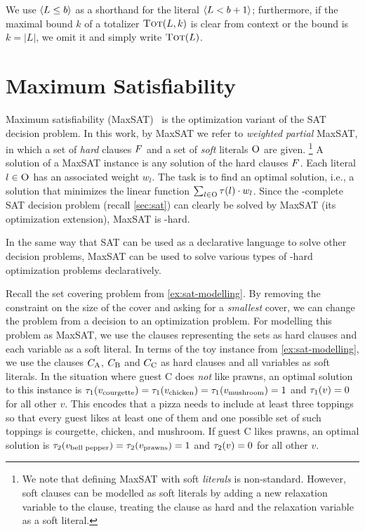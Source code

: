 We use $\langle L \leq b \rangle$ as a shorthand for the literal $\langle L < b+1 \rangle$;
furthermore, if the maximal bound $k$ of a totalizer $\textsc{Tot}(L,k)$ is clear from context or the bound is $k=|L|$, we omit it and simply write $\textsc{Tot}(L)$.

\section{Maximum Satisfiability\label{sec:max-sat}}

Maximum satisfiability (MaxSAT)~\autocite{handbook2-maxsat} is the optimization variant of the SAT decision problem.
In this work, by MaxSAT we refer to \emph{weighted partial} MaxSAT, in which a set of \emph{hard} clauses $F$ and a set of \emph{soft} literals $\textsc{O}$ are given.%
\footnote{We note that defining MaxSAT with soft \emph{literals} is non-standard. However, soft clauses can be modelled as soft literals by adding a new relaxation variable to the clause, treating the clause as hard and the relaxation variable as a soft literal.}
A solution of a MaxSAT instance is any solution of the hard clauses $F$.
Each literal $l \in \textsc{O}$ has an associated weight $w_l$.
The task is to find an optimal solution, i.e., a solution that minimizes the linear function $\sum_{l\in \textsc{O}}\tau(l)\cdot w_l$.
Since the \NP-complete SAT decision problem (recall \cref{sec:sat}) can clearly be solved by MaxSAT (its optimization extension), MaxSAT is \NP-hard.

In the same way that SAT can be used as a declarative language to solve other decision problems, MaxSAT can be used to solve various types of \NP-hard optimization problems declaratively.

\begin{example}\label{ex:maxsat-modelling}
  Recall the set covering problem from \cref{ex:sat-modelling}.
  By removing the constraint on the size of the cover and asking for a \emph{smallest} cover, we can change the problem from a decision to an optimization problem.
  For modelling this problem as MaxSAT, we use the clauses representing the sets as hard clauses and each variable as a soft literal.
  In terms of the toy instance from \cref{ex:sat-modelling}, we use the clauses $C_\text{A}$, $C_\text{B}$ and $C_\text{C}$ as hard clauses and all variables as soft literals.
  In the situation where guest C does \emph{not} like prawns, an optimal solution to this instance is $\tau_1(v_\text{courgette}) = \tau_1(v_\text{chicken}) = \tau_1(v_\text{mushroom}) = 1$ and $\tau_1(v) = 0$ for all other $v$.
  This encodes that a pizza needs to include at least three toppings so that every guest likes at least one of them and one possible set of such toppings is courgette, chicken, and mushroom.
  If guest C likes prawns, an optimal solution is $\tau_2(v_\text{bell pepper}) = \tau_2(v_\text{prawns}) = 1$ and $\tau_2(v) = 0$ for all other $v$.
\end{example}

